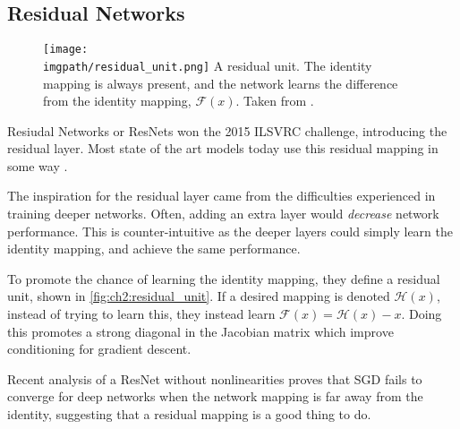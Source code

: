 \subsection{Residual Networks}
  \begin{figure}[tb]
    \centering
    \texttt{[image: \\imgpath/residual\_unit.png]}
          {A residual unit. The identity mapping is always present, and the
            network learns the difference from the identity mapping, $\mathcal{F}(x)$.
            Taken from \cite{he_deep_2016}.}
      \label{fig:ch2:residual_unit}
  \end{figure}
  Resiudal Networks or ResNets won the 2015 ILSVRC challenge, introducing the
  residual layer. Most state of the art models today use this residual mapping
  in some way \cite{zagoruyko_wide_2016-1, xie_aggregated_2017}.

  The inspiration for the residual layer came from the difficulties
  experienced in training deeper networks.  Often, adding an extra layer would
  \emph{decrease} network performance. This is counter-intuitive as the deeper
  layers could simply learn the identity mapping, and achieve the same
  performance.

  To promote the chance of learning the identity mapping, they define a residual
  unit, shown in \autoref{fig:ch2:residual_unit}. If a desired mapping is
  denoted $\mathcal{H}(x)$, instead of trying to learn this, they instead learn
  $\mathcal{F}(x) = \mathcal{H}(x) - x$. Doing this promotes a strong diagonal
  in the Jacobian matrix which improve conditioning for gradient descent. 
  
  Recent analysis of a ResNet without nonlinearities
  \cite{bartlett_representing_2018, bartlett_gradient_2018} proves that SGD
  fails to converge for deep networks when the network mapping is far away from
  the identity, suggesting that a residual mapping is a good thing to do.
